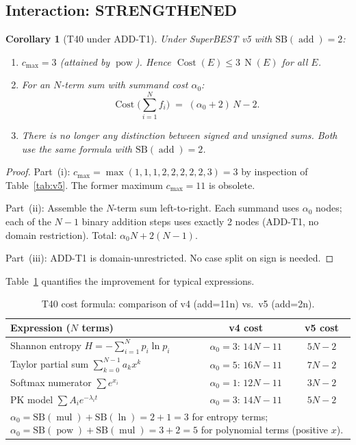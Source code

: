 \documentclass[12pt,a4paper]{article}
\newtheorem{corollary}[theorem]{Corollary}
\theoremstyle{definition}
\newcommand{\mulop}{\operatorname{mul}}
\newcommand{\addop}{\operatorname{add}}
\newcommand{\powop}{\operatorname{pow}}
\newcommand{\SB}{\mathrm{SB}}
\newcommand{\Cost}{\operatorname{Cost}}
\newcommand{\NOp}{\operatorname{N}}
\newcommand{\Strengthened}{\textcolor{strengthened}{\textbf{STRENGTHENED}}}
\begin{document}
\subsection{Interaction: \Strengthened}

\begin{corollary}[T40 under ADD-T1]
\label{cor:T40-v5}
Under SuperBEST v5 with $\SB(\addop) = 2$:
\begin{enumerate}
\item[\textup{(i)}] $c_{\max} = 3$ \textup{(attained by $\powop$)}.
  Hence $\Cost(E) \leq 3\,\NOp(E)$ for all $E$.
\item[\textup{(ii)}] For an $N$-term sum with summand cost $\alpha_0$:
  \[
    \Cost\!\bigl(\textstyle\sum_{i=1}^N f_i\bigr)
    \;=\; (\alpha_0 + 2)\,N - 2.
  \]
\item[\textup{(iii)}] There is no longer any distinction between signed and
  unsigned sums.  Both use the same formula with $\SB(\addop)=2$.
\end{enumerate}
\end{corollary}

\begin{proof}
Part~(i): $c_{\max} = \max(1,1,1,2,2,2,2,2,3) = 3$ by inspection of
Table~\ref{tab:v5}.  The former maximum $c_{\max}=11$ is obsolete.

Part~(ii): Assemble the $N$-term sum left-to-right.  Each summand uses $\alpha_0$
nodes; each of the $N-1$ binary addition steps uses exactly 2 nodes (ADD-T1,
no domain restriction).  Total: $\alpha_0 N + 2(N-1)$.

Part~(iii): ADD-T1 is domain-unrestricted.  No case split on sign is needed.
\end{proof}

Table~\ref{tab:T40-comparison} quantifies the improvement for typical expressions.

\begin{table}[h]
\centering
\caption{T40 cost formula: comparison of v4 (add=11n) vs.\ v5 (add=2n).}
\label{tab:T40-comparison}
\smallskip
\begin{tabular}{@{}lcc@{}}
\toprule
\textbf{Expression ($N$ terms)} & \textbf{v4 cost} & \textbf{v5 cost} \\
\midrule
Shannon entropy $H=-\sum_{i=1}^N p_i\ln p_i$
  & $\alpha_0=3$: $14N-11$ & $5N-2$ \\
Taylor partial sum $\sum_{k=0}^{N-1} a_k x^k$
  & $\alpha_0=5$: $16N-11$ & $7N-2$ \\
Softmax numerator $\sum e^{x_i}$
  & $\alpha_0=1$: $12N-11$ & $3N-2$ \\
PK model $\sum A_i e^{-\lambda_i t}$
  & $\alpha_0=3$: $14N-11$ & $5N-2$ \\
\bottomrule
\multicolumn{3}{l}{\footnotesize
  $\alpha_0=\SB(\mulop)+\SB(\ln)=2+1=3$ for entropy terms;
  $\alpha_0=\SB(\powop)+\SB(\mulop)=3+2=5$ for polynomial terms (positive $x$).}
\end{tabular}
\end{table}
\end{document}
